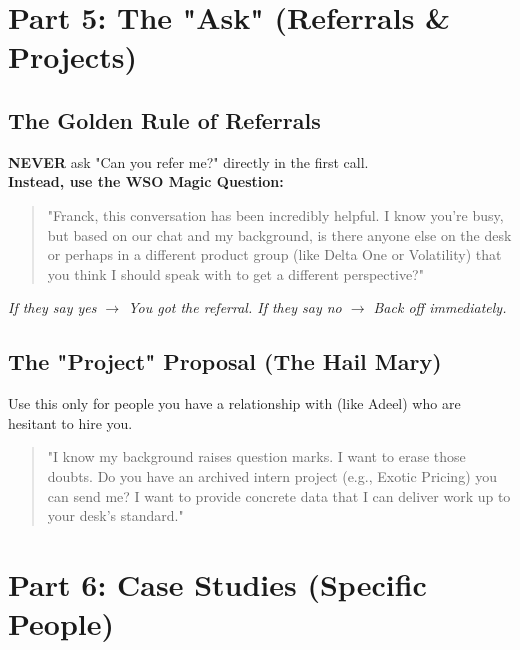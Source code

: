 \documentclass[11pt, a4paper]{article}
\begin{document}
\section{Part 5: The "Ask" (Referrals \& Projects)}

\subsection{The Golden Rule of Referrals}
\textbf{NEVER} ask "Can you refer me?" directly in the first call. \\
\textbf{Instead, use the WSO Magic Question:}
\begin{quote}
    "Franck, this conversation has been incredibly helpful. I know you're busy, but based on our chat and my background, is there anyone else on the desk or perhaps in a different product group (like Delta One or Volatility) that you think I should speak with to get a different perspective?"
\end{quote}
\textit{If they say yes $\rightarrow$ You got the referral. If they say no $\rightarrow$ Back off immediately.}

\subsection{The "Project" Proposal (The Hail Mary)}
Use this only for people you have a relationship with (like Adeel) who are hesitant to hire you.
\begin{quote}
    "I know my background raises question marks. I want to erase those doubts. Do you have an archived intern project (e.g., Exotic Pricing) you can send me? I want to provide concrete data that I can deliver work up to your desk's standard."
\end{quote}

\section{Part 6: Case Studies (Specific People)}
\end{document}
